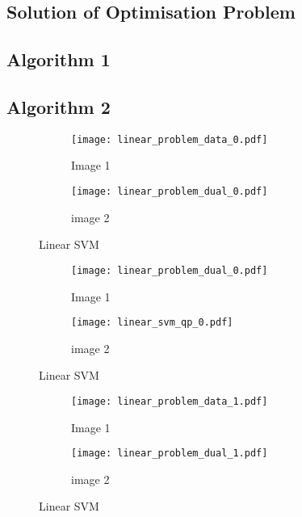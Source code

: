 \documentclass[10pt, a4paper,reqno]{amsart}
\begin{document}
\subsection{Solution of Optimisation Problem}


\subsection{Algorithm 1}


\subsection{Algorithm 2}


\begin{figure}[H]
	\centering	
	\begin{subfigure}{1.0\textwidth}
		\centering
		\texttt{[image: linear\_problem\_data\_0.pdf]}
		\caption{Image 1}
	\end{subfigure}
	\begin{subfigure}{1.0\textwidth}
		\centering
		\texttt{[image: linear\_problem\_dual\_0.pdf]}
		\caption{image 2}
	\end{subfigure}
	\caption{Linear SVM}
\end{figure}

\begin{figure}[H]
	\centering	
	\begin{subfigure}{1.0\textwidth}
		\centering
		\texttt{[image: linear\_problem\_dual\_0.pdf]}
		\caption{Image 1}
	\end{subfigure}
	\begin{subfigure}{1.0\textwidth}
		\centering
		\texttt{[image: linear\_svm\_qp\_0.pdf]}
		\caption{image 2}
	\end{subfigure}
	\caption{Linear SVM}
\end{figure}

\begin{figure}[H]
	\centering	
	\begin{subfigure}{1.0\textwidth}
		\centering
		\texttt{[image: linear\_problem\_data\_1.pdf]}
		\caption{Image 1}
	\end{subfigure}
	\begin{subfigure}{1.0\textwidth}
		\centering
		\texttt{[image: linear\_problem\_dual\_1.pdf]}
		\caption{image 2}
	\end{subfigure}
	\caption{Linear SVM}
\end{figure}
\end{document}

